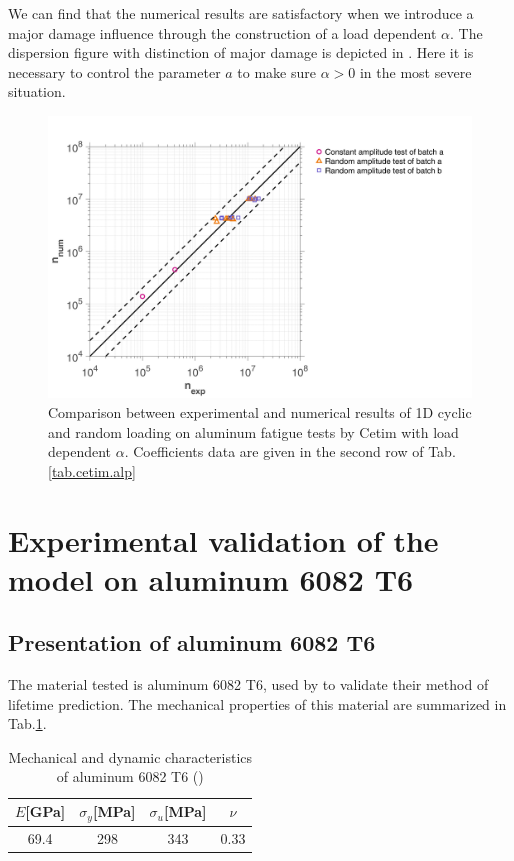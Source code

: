We can find that the numerical results are satisfactory when we introduce a major damage influence through the construction of a load dependent $\alpha$. The dispersion figure with distinction of major damage is depicted in . Here it is necessary to control the parameter $a$ to make sure $\alpha>0$ in the most severe situation.

\begin{figure}[!h]
\centering
\includegraphics[width=\textwidth]{figures//Cetim_err.png} 
\caption{Comparison between experimental and numerical results of 1D cyclic and random loading on aluminum fatigue tests by Cetim with load dependent $\alpha$. Coefficients data are given in the second row of Tab.\ref{tab.cetim.alp}}
\label{fig.Cetimerr}
\end{figure}

\clearpage
\section{Experimental validation of the model on aluminum 6082 T6}
\subsection{Presentation of aluminum 6082 T6}

The material tested is aluminum 6082 T6, used by \cite{susmel2003multiaxial} to validate their method of lifetime prediction. The mechanical properties of this material are summarized in Tab.\ref{tab.al6082t6}.

\begin{table}[!h]
\centering
\begin{tabular}{|c|c|c|c|}
\hline
\textbf{$E${[}GPa{]}} & \textbf{$\sigma_{y}${[}MPa{]}} & \textbf{$\sigma_u${[}MPa{]}} & \textbf{$\nu$} \\ \hline
69.4                                  & 298                                & 343                         & 0.33                 \\ \hline
\end{tabular}
\caption{Mechanical and dynamic characteristics of aluminum 6082 T6 (\cite{susmel2003multiaxial})}
\label{tab.al6082t6}
\end{table}

